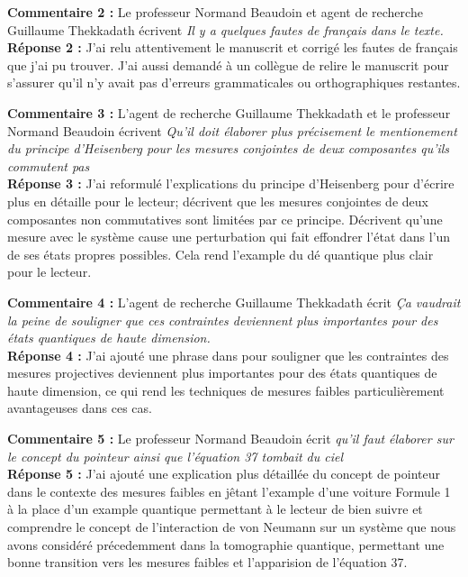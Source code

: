 \documentclass[superscriptaddress,12pt]{article}
\begin{document}
\vspace{1cm}
\textbf{Commentaire 2 :} Le professeur Normand Beaudoin et agent de recherche Guillaume Thekkadath écrivent \textit{Il y a quelques fautes de français dans le texte.} \\
\textbf{Réponse 2 :} J'ai relu attentivement le manuscrit et corrigé les fautes de français
que j'ai pu trouver. J'ai aussi demandé à un collègue de relire le manuscrit pour s'assurer
qu'il n'y avait pas d'erreurs grammaticales ou orthographiques restantes.

\vspace{1cm}

\textbf{Commentaire 3 :} L'agent de recherche Guillaume Thekkadath et le professeur Normand Beaudoin écrivent \textit{Qu'il doit élaborer plus précisement le mentionement du principe d'Heisenberg pour les mesures conjointes de deux composantes qu'ils commutent pas } \\
\textbf{Réponse 3 :} J'ai reformulé l'explications du principe d'Heisenberg pour d'écrire plus en détaille pour le lecteur; 
décrivent que les mesures conjointes de deux composantes non commutatives sont limitées par ce principe. Décrivent qu'une 
mesure avec le système cause une perturbation qui fait effondrer l'état dans l'un de ses états propres possibles. Cela 
rend l'example du dé quantique plus clair pour le lecteur. 

\vspace{1cm}

\textbf{Commentaire 4 :} L'agent de recherche Guillaume Thekkadath écrit \textit{Ça vaudrait la peine de souligner que ces contraintes deviennent plus importantes pour des états quantiques de haute dimension. } \\

\textbf{Réponse 4 :} J'ai ajouté une phrase dans pour souligner que les contraintes
des mesures projectives deviennent plus importantes pour des états quantiques de haute dimension,
ce qui rend les techniques de mesures faibles particulièrement avantageuses dans ces cas.

\vspace{1cm}

\textbf{Commentaire 5 :} Le professeur Normand Beaudoin écrit \textit{qu'il faut élaborer sur le concept du pointeur ainsi que l'équation 37 tombait du ciel} \\
\textbf{Réponse 5 :} J'ai ajouté une explication plus détaillée du concept de pointeur dans le contexte
des mesures faibles en jêtant l'example d'une voiture Formule 1 à la place d'un example quantique permettant à 
le lecteur de bien suivre et comprendre le concept de l'interaction de von Neumann sur un système que nous avons considéré précedemment dans la tomographie quantique, permettant une bonne transition vers les mesures faibles et l'apparision de l'équation 37.
\end{document}
